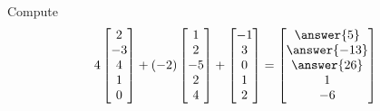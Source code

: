 \documentclass{ximera}
\author{Robert Beezer}
\begin{document}
\begin{exercise}
  Compute
  \[
    4\colvector{2\\-3\\4\\1\\0}+
    (-2)\colvector{1\\2\\-5\\2\\4}+
    \colvector{-1\\3\\0\\1\\2} =
    \colvector{\answer{5}\\\answer{-13}\\\answer{26}\\1\\-6}
  \]
\end{exercise}
\end{document}
